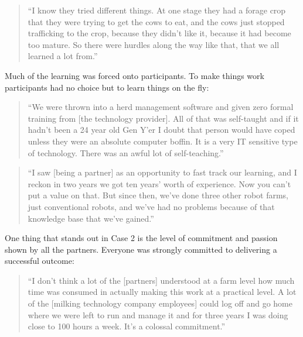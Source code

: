 \begin{quote}
\small
\enquote{I know they tried different things. At one stage they had a forage crop that they were trying to get the cows to eat, and the cows just stopped trafficking to the crop, because they didn't like it, because it had become too mature. So there were hurdles along the way like that, that we all learned a lot from.} \\
\end{quote}

Much of the learning was forced onto participants. To make things work participants had no choice but to learn things on the fly:

\begin{quote}
\small
\enquote{We were thrown into a herd management software and given zero formal training from [the technology provider]. All of that was self-taught and if it hadn't been a 24 year old Gen Y'er I doubt that person would have coped unless they were an absolute computer boffin. It is a very IT sensitive type of technology. There was an awful lot of self-teaching.} \\
\end{quote}

\begin{quote}
\small
\enquote{I saw [being a partner] as an opportunity to fast track our learning, and I reckon in two years we got ten years' worth of experience. Now you can't put a value on that. But since then, we've done three other robot farms, just conventional robots, and we've had no problems because of that knowledge base that we've gained.} \\
\end{quote}

One thing that stands out in Case 2 is the level of commitment and passion shown by all the partners. Everyone was strongly committed to delivering a successful outcome:

\begin{quote}
\small
\enquote{I don't think a lot of the [partners] understood at a farm level how much time was consumed in actually making this work at a practical level. A lot of the [milking technology company employees] could log off and go home where we were left to run and manage it and for three years I was doing close to 100 hours a week. It's a colossal commitment.} \\
\end{quote}

